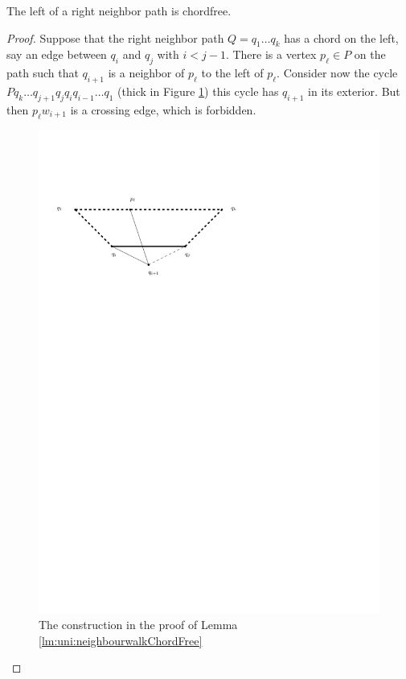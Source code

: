   \begin{lemma}
    \label{lm:uni:neighbourwalkChordFree}
    The left of a right neighbor path is chordfree.
  \end{lemma}
  \begin{proof}
    Suppose that the right neighbor path $Q = q_1 \ldots q_k$  has a chord on the left, say an edge between $q_i$ and $q_j$ with $i< j -1 $. There is a vertex $p_\ell \in P$ on the path such that $q_{i+1}$ is a neighbor of $p_\ell$ to the left of $p_\ell$. Consider now the cycle $P q_k \ldots q_{j+1} q_j q_i q_{i-1} \ldots q_1$
    (thick in Figure \ref{fig:uni:neihbourwalkChordFree}) this cycle has $q_{i+1}$ in its exterior. But then $p_\ell w_{i+1}$ is a crossing edge, which is forbidden.

    \begin{figure}[h]
      \centering
      \includegraphics[scale=1]{unifiedAlgo/img/neighbourWalkChords}
      \caption{The construction in the proof of Lemma \ref{lm:uni:neighbourwalkChordFree}}
      \label{fig:uni:neihbourwalkChordFree}
    \end{figure}
  \end{proof}
